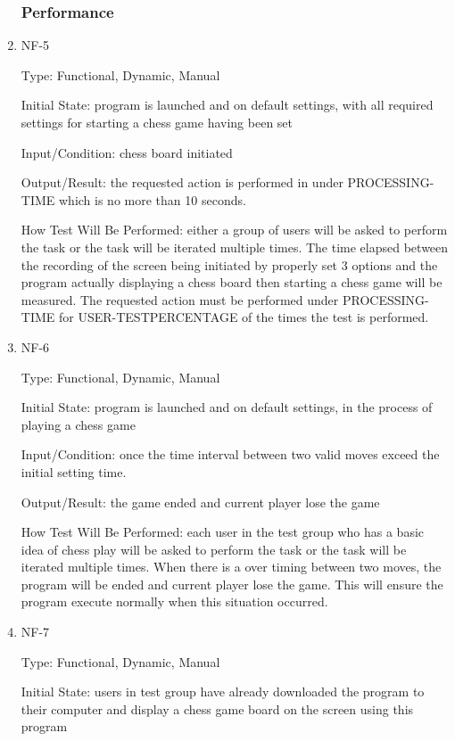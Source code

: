 \documentclass[12pt, titlepage]{article}
\begin{document}
\begin{enumerate}
\subsubsection{Performance}

\item{NF-5\\}

Type: Functional, Dynamic, Manual

Initial State: program is launched and on default settings, with all required settings for starting a chess game having been set

Input/Condition: chess board initiated

Output/Result: the requested action is performed in under PROCESSING-TIME which is no more than 10 seconds.

How Test Will Be Performed: either a group of users will be asked to perform the task or the task will be iterated multiple times. The time elapsed between the recording of the screen being initiated by properly set 3 options and the program actually displaying a chess board then starting a chess game will be measured. The requested action must be performed under PROCESSING-TIME for USER-TESTPERCENTAGE of the times the test is performed.

\item{NF-6\\}

Type: Functional, Dynamic, Manual

Initial State: program is launched and on default settings, in the process of playing a chess game

Input/Condition: once the time interval between two valid moves exceed the initial setting time.

Output/Result: the game ended and current player lose the game

How Test Will Be Performed: each user in the test group who has a basic idea of chess play will be asked to perform the task or the task will be iterated multiple times. When there is a over timing between two moves, the program will be ended and current player lose the game. This will ensure the program execute normally when this situation occurred.

\item{NF-7\\}

Type:  Functional, Dynamic, Manual

Initial State: users in test group have already downloaded the program to their computer and display a chess game board on the screen using this program 


\end{enumerate}
\end{document}
